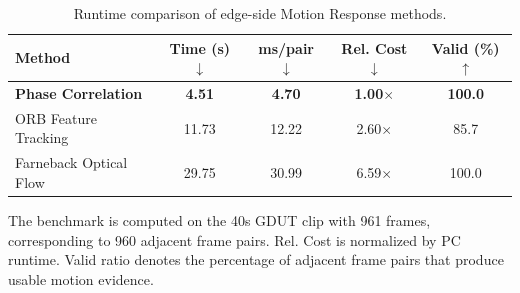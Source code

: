 \begin{table}[!t]
\renewcommand{\arraystretch}{1.14}
\caption{Runtime comparison of edge-side Motion Response methods.}
\label{tab:motion_benchmark}
\centering
\footnotesize
\setlength{\tabcolsep}{1.5pt}
\begin{tabular*}{\columnwidth}{@{\extracolsep{\fill}}lcccc@{}}
\toprule
Method & Time (s) $\downarrow$ & ms/pair $\downarrow$ & Rel. Cost $\downarrow$ & Valid (\%) $\uparrow$ \\
\midrule
\textbf{Phase Correlation} & \textbf{4.51} & \textbf{4.70} & \textbf{1.00$\times$} & \textbf{100.0} \\
ORB Feature Tracking & 11.73 & 12.22 & 2.60$\times$ & 85.7 \\
Farneback Optical Flow & 29.75 & 30.99 & 6.59$\times$ & 100.0 \\
\bottomrule
\end{tabular*}%
\vspace{0.2em}

\parbox{\columnwidth}{\footnotesize The benchmark is computed on the 40s GDUT clip with 961 frames, corresponding to 960 adjacent frame pairs. Rel. Cost is normalized by PC runtime. Valid ratio denotes the percentage of adjacent frame pairs that produce usable motion evidence.}
\end{table}
